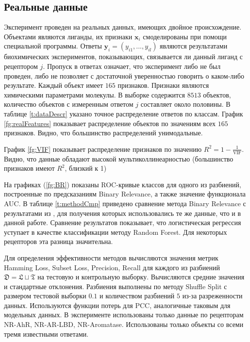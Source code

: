 \documentclass{ITaSconf}
\newcommand{\x}{\mathbf{x}}
\newcommand{\y}{\mathbf{y}}
\begin{document}
\subsection{Реальные данные}
Эксперимент проведен на реальных данных, имеющих двойное происхождение. Объектами являются лиганды, их признаки $\x_i$ смоделированы при помощи специальной программы. Ответы $\y_i=(y_{i1},...,y_{il})$ являются результатами биохимических экспериментов, показывающих, связывается ли данный лиганд с рецептором $j$. Пропуск в ответах означает, что эксперимент либо не был проведен, либо не позволяет с достаточной уверенностью говорить о каком-либо результате. Каждый объект имеет $165$ признаков. Признаки являются химическими параметрами молекулы. В выборке содержится $8513$ объектов, количество объектов с измеренным ответом $j$ составляет около половины. В таблице \ref{t:dataDescr} указано точное распределение ответов по классам. График \ref{fg:realFeatures} показывает распределение объектов по значениям всех $165$ признаков. Видно, что большинство распределений унимодальные.

График \ref{fg:VIF} показывает распределение признаков по значению $R^2=1-\frac{1}{\mbox{VIF}}$. Видно, что данные обладают высокой мультиколлинеарностью (большинство признаков имеют $R^2$, близкий к 1)

На графиках (\ref{fg:BR}) показаны ROC-кривые классов для одного из разбиений, построенные по предсказаниям Binary Relevance, а также значение функционала AUC. В таблице \ref{t:methodCmp} приведено сравнение метода Binary Relevance с результатами из \cite{qsar}, для получения которых использовались те же данные, что и в данной работе. Сравнение результатов показывает, что логистическая регрессия уступает в качестве классификации методу Random Forest. Для некоторых рецепторов эта разница значительна.

Для определения эффективности методов вычисляются значения метрик Hamming Loss, Subset Loss, Precision, Recall для каждого из разбиений $\mathfrak{D}=\mathfrak{L}\sqcup\mathfrak{T}$ на тестовую и контрольную выборку. Вычисляются средние значения и стандартные отклонения. Разбиения выполнены по методу Shuffle Split с размером тестовой выборки $0.1$ и количеством разбиений $5$ из-за разреженности данных. Используются функции потерь для PCC, аналогичные таковым для модельных данных. В эксперименте использованы только данные по рецепторам NR-AhR, NR-AR-LBD, NR-Aromatase. Использованы только объекты со всеми тремя известными ответами.

\end{document}
